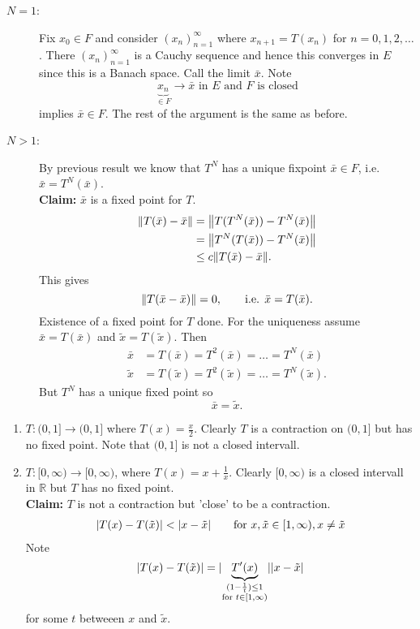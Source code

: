 \begin{beweis}
	\begin{description}
		\item[$N=1$:] Fix $x_0 \in F$ and consider $(x_n)_{n=1}^{\infty}$ where $x_{n+1} = T(x_n)$ for $n=0,1,2, \dots$. There $(x_n)_{n=1}^{\infty}$ is a Cauchy sequence and hence this converges in $E$ since this is a Banach space. Call the limit $\bar{x}$. Note
		\[
			\underset{\in F}{\underbrace{x_n}} \to \bar{x} \text{ in }E \text{ and $F$ is closed}
		\] 
		implies $\bar{x} \in F$. The rest of the argument is the same as before.
		\item[$N>1$:] By previous result we know that $T^N$ has a unique fixpoint $\bar{x} \in F$, i.e. $\bar{x} = T^N(\bar{x})$. \\
		\textbf{Claim:} \text{    }     $\bar{x}$ is a fixed point for $T$.
		\begin{align*}
			\norm{T(\bar{x})-\bar{x}} &= \norm{T(T^N(\bar{x}))- T^N(\bar{x})} \\
			&= \norm{T^N(T(\bar{x}))- T^N(\bar{x})} \\
			&\leq c \norm{T(\bar{x})-\bar{x}}.
 		\end{align*}
		This gives 
		\[
			\norm{T(\bar{x}-\bar{x})} = 0, \qquad \text{i.e. }\bar{x} = T(\bar{x}).
		\]
		Existence of a fixed point for $T$ done. For the uniqueness assume $\bar{x} = T(\bar{x})$ and $\tilde x = T( \tilde x)$. Then
	\begin{align*}
		\bar{x} &= T( \bar{x}) = T^2(\bar{x}) = \dots = T^N(\bar{x}) \\
		\tilde x &= T(\tilde x) = T^2(\tilde x) = \dots = T^N(\tilde x).
	\end{align*}
	But $T^N$ has a unique fixed point so 
	\[
		\bar{x} = \tilde x.
	\]
	\end{description}
\end{beweis}
\begin{bemerkung}
	\begin{enumerate}[(1)]
		\item $T: (0,1] \to (0,1]$ where $T(x) = \frac{x}{2}$. Clearly $T$ is a contraction on $(0,1]$ but has no fixed point. Note that $(0,1]$ is not a closed intervall. 
		\item $T: [0,\infty) \to [0,\infty)$, where $T(x) = x + \frac{1}{x}$. Clearly $[0,\infty)$ is a closed intervall in $\mathbb{R}$ but $T$ has no fixed point. \\
		\textbf{Claim:} \text{    }     $T$ is not a contraction but 'close' to be a contraction. \\
		\begin{align*}
			\lvert T(x)-T(\tilde x)\rvert < \lvert x- \tilde x\rvert \qquad \text{for }x, \tilde x \in [1, \infty), x \neq \tilde x
		\end{align*}
		Note \[
			\lvert T(x)- T( \tilde x)\rvert = \lvert\underset{\substack{(1- \frac{1}{t})\leq 1 \\ \text{for }t \in [1,\infty)}}{\underbrace{T'(x)}}\rvert\lvert x- \tilde x\rvert
		\] for some $t$ betweeen $x$ and $\tilde x$.
	\end{enumerate}
\end{bemerkung}
